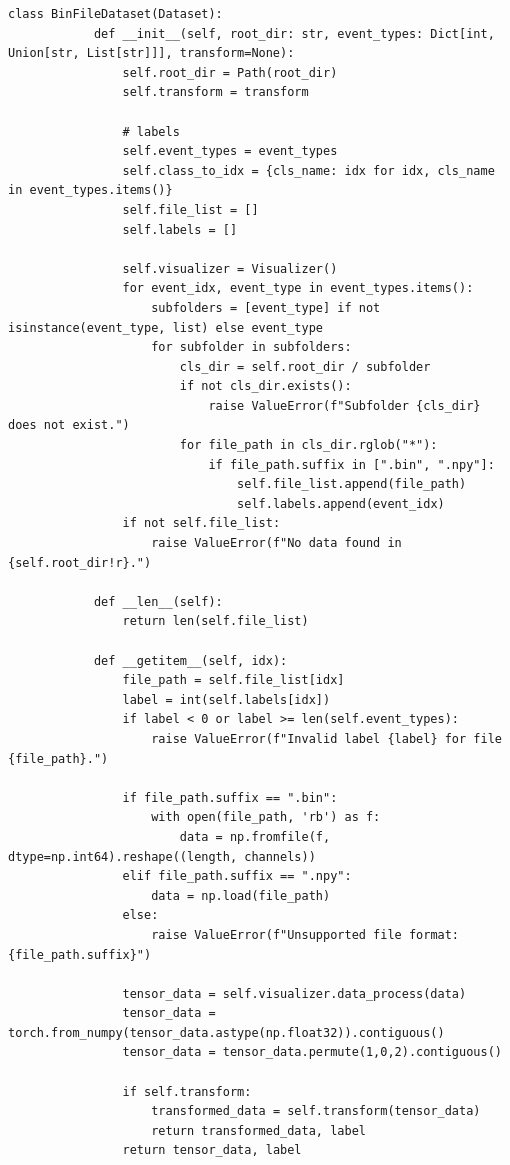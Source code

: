     \begin{lstlisting}[style=pythonstyle, caption={Custom Dataset for loading and processing footstep files}, label=lst:binfile_dataset]
        class BinFileDataset(Dataset):
            def __init__(self, root_dir: str, event_types: Dict[int, Union[str, List[str]]], transform=None):
                self.root_dir = Path(root_dir)
                self.transform = transform
        
                # labels
                self.event_types = event_types
                self.class_to_idx = {cls_name: idx for idx, cls_name in event_types.items()}
                self.file_list = []
                self.labels = []
        
                self.visualizer = Visualizer()
                for event_idx, event_type in event_types.items():
                    subfolders = [event_type] if not isinstance(event_type, list) else event_type
                    for subfolder in subfolders:
                        cls_dir = self.root_dir / subfolder
                        if not cls_dir.exists():
                            raise ValueError(f"Subfolder {cls_dir} does not exist.")
                        for file_path in cls_dir.rglob("*"):
                            if file_path.suffix in [".bin", ".npy"]:
                                self.file_list.append(file_path)
                                self.labels.append(event_idx)
                if not self.file_list:
                    raise ValueError(f"No data found in {self.root_dir!r}.")
        
            def __len__(self):
                return len(self.file_list)
        
            def __getitem__(self, idx):
                file_path = self.file_list[idx]
                label = int(self.labels[idx])
                if label < 0 or label >= len(self.event_types):
                    raise ValueError(f"Invalid label {label} for file {file_path}.")
        
                if file_path.suffix == ".bin":
                    with open(file_path, 'rb') as f:
                        data = np.fromfile(f, dtype=np.int64).reshape((length, channels))
                elif file_path.suffix == ".npy":
                    data = np.load(file_path)
                else:
                    raise ValueError(f"Unsupported file format: {file_path.suffix}")
        
                tensor_data = self.visualizer.data_process(data)
                tensor_data = torch.from_numpy(tensor_data.astype(np.float32)).contiguous()
                tensor_data = tensor_data.permute(1,0,2).contiguous()
        
                if self.transform:
                    transformed_data = self.transform(tensor_data)
                    return transformed_data, label
                return tensor_data, label
    \end{lstlisting}

